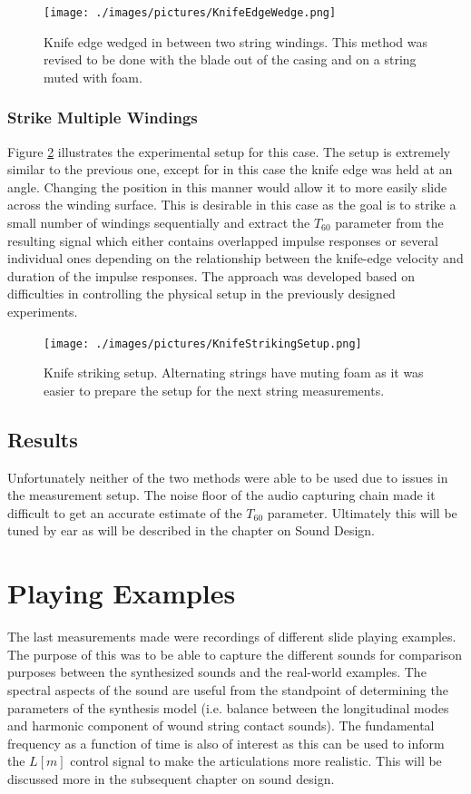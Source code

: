 \documentclass[../main.tex]{subfiles}
\begin{document}
\begin{figure}[h]
    \centering
    \texttt{[image: ./images/pictures/KnifeEdgeWedge.png]}
    \caption{Knife edge wedged in between two string windings. This method was revised to be done with the blade out of the casing and on a string muted with foam.}
    \label{fig:KnifeEdgeWedge}
\end{figure}

\subsubsection{Strike Multiple Windings}
Figure \ref{fig:KnifeStrikingSetup} illustrates the experimental setup for this case. The setup is extremely similar to the previous one, except for in this case the knife edge was held at an angle. Changing the position in this manner would allow it to more easily slide across the winding surface. This is desirable in this case as the goal is to strike a small number of windings sequentially and extract the $T_{60}$ parameter from the resulting signal which either contains overlapped impulse responses or several individual ones depending on the relationship between the knife-edge velocity and duration of the impulse responses. The approach was developed based on difficulties in controlling the physical setup in the previously designed experiments.

\begin{figure}[h]
    \centering
    \texttt{[image: ./images/pictures/KnifeStrikingSetup.png]}
    \caption{Knife striking setup. Alternating strings have muting foam as it was easier to prepare the setup for the next string measurements.}
    \label{fig:KnifeStrikingSetup}
\end{figure}

\subsection{Results}
Unfortunately neither of the two methods were able to be used due to issues in the measurement setup. The noise floor of the audio capturing chain made it difficult to get an accurate estimate of the $T_{60}$ parameter. Ultimately this will be tuned by ear as will be described in the chapter on Sound Design.

\section{Playing Examples}
 The last measurements made were recordings of different slide playing examples. The purpose of this was to be able to capture the different sounds for comparison purposes between the synthesized sounds and the real-world examples. The spectral aspects of the sound are useful from the standpoint of determining the parameters of the synthesis model (i.e. balance between the longitudinal modes and harmonic component of wound string contact sounds). The fundamental frequency as a function of time is also of interest as this can be used to inform the $L[m]$ control signal to make the articulations more realistic. This will be discussed more in the subsequent chapter on sound design.
\end{document}
